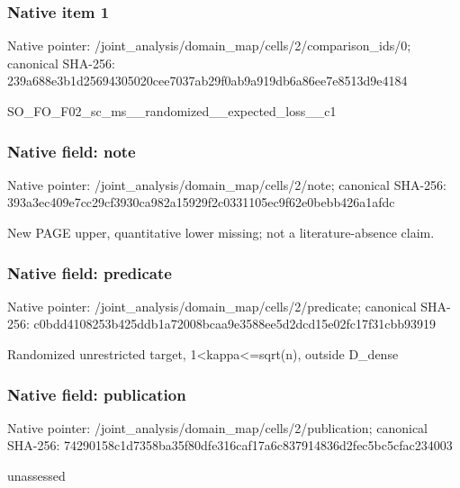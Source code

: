 \documentclass[10pt,a4paper]{article}
\begin{document}
\subsubsection{Native item 1}
Native pointer: /joint\_\allowbreak{}analysis/domain\_\allowbreak{}map/cells/2/comparison\_\allowbreak{}ids/0; canonical SHA-256: 239a688e3b1d25694305020cee7037ab29f0ab9a919db6a86ee7e8513d9e4184

\begingroup\raggedright\sloppy SO\_\allowbreak{}FO\_\allowbreak{}F02\_\allowbreak{}sc\_\allowbreak{}ms\_\allowbreak{}\_\allowbreak{}randomized\_\allowbreak{}\_\allowbreak{}expected\_\allowbreak{}loss\_\allowbreak{}\_\allowbreak{}c1\par\endgroup

\subsubsection{Native field: note}
Native pointer: /joint\_\allowbreak{}analysis/domain\_\allowbreak{}map/cells/2/note; canonical SHA-256: 393a3ec409e7cc29cf3930ca982a15929f2c0331105ec9f62e0bebb426a1afdc

\begingroup\raggedright\sloppy New PAGE upper,\allowbreak{} quantitative lower missing;\allowbreak{} not a literature-absence claim.\par\endgroup

\subsubsection{Native field: predicate}
Native pointer: /joint\_\allowbreak{}analysis/domain\_\allowbreak{}map/cells/2/predicate; canonical SHA-256: c0bdd4108253b425ddb1a72008bcaa9e3588ee5d2dcd15e02fc17f31cbb93919

\begingroup\raggedright\sloppy Randomized unrestricted target,\allowbreak{} 1<kappa<=\allowbreak{}sqrt(n),\allowbreak{} outside D\_\allowbreak{}dense\par\endgroup

\subsubsection{Native field: publication}
Native pointer: /joint\_\allowbreak{}analysis/domain\_\allowbreak{}map/cells/2/publication; canonical SHA-256: 74290158c1d7358ba35f80dfe316caf17a6c837914836d2fec5bc5cfac234003

\begingroup\raggedright\sloppy unassessed\par\endgroup
\end{document}
